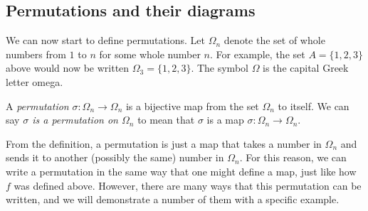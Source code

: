
\subsection{Permutations and their diagrams}

We can now start to define permutations. Let $\Omega_{n}$ denote the set of whole numbers from $1$ to $n$ for some whole number $n$. For example, the set $A = \{1, 2, 3\}$ above would now be written $\Omega_{3} = \{1, 2, 3\}$. The symbol $\Omega$ is the capital Greek letter omega.

\begin{definition}[(Permutation)]
    A \textit{permutation} $\sigma \colon \Omega_{n} \to \Omega_{n}$ is a bijective map from the set $\Omega_{n}$ to itself. We can say \textit{$\sigma$ is a permutation on $\Omega_{n}$} to mean that $\sigma$ is a map $\sigma \colon \Omega_{n} \to \Omega_{n}$.
\end{definition}

From the definition, a permutation is just a map that takes a number in $\Omega_{n}$ and sends it to another (possibly the same) number in $\Omega_{n}$. For this reason, we can write a permutation in the same way that one might define a map, just like how $f$ was defined above. However, there are many ways that this permutation can be written, and we will demonstrate a number of them with a specific example.

